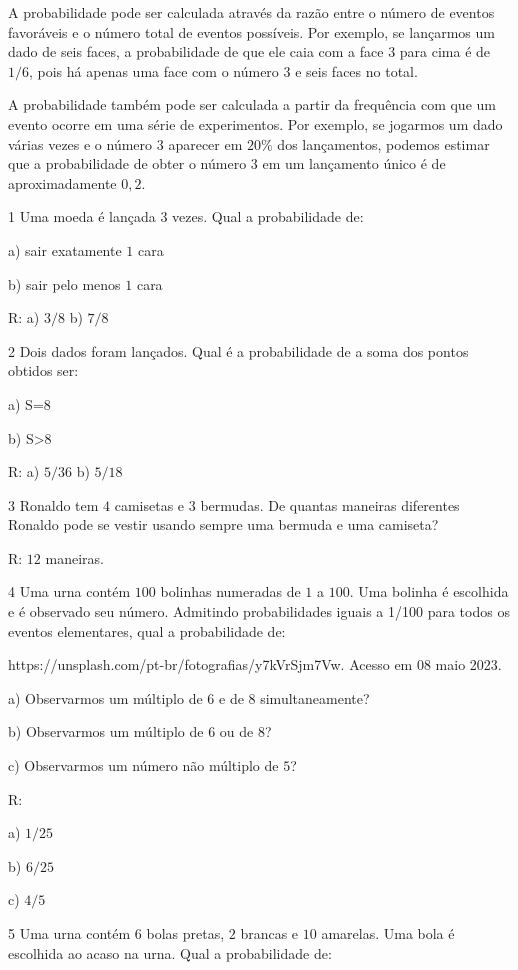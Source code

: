 A probabilidade pode ser calculada através da razão entre o número de
eventos favoráveis e o número total de eventos possíveis. Por exemplo,
se lançarmos um dado de seis faces, a probabilidade de que ele caia com
a face $3$ para cima é de $1/6$, pois há apenas uma face com o número $3$ e
seis faces no total.

A probabilidade também pode ser calculada a partir da frequência com que
um evento ocorre em uma série de experimentos. Por exemplo, se jogarmos
um dado várias vezes e o número $3$ aparecer em $20\%$ dos lançamentos,
podemos estimar que a probabilidade de obter o número $3$ em um lançamento
único é de aproximadamente $0,2$.


\num{1}  Uma moeda é lançada $3$ vezes. Qual a probabilidade de:

a) sair exatamente $1$ cara

b) sair pelo menos $1$ cara

R: a) $3/8$ b) $7/8$

\num{2}  Dois dados foram lançados. Qual é a probabilidade de a soma dos
pontos obtidos ser:

a) S=8

b) S\textgreater8

R: a) $5/36$ b) $5/18$

\num{3}  Ronaldo tem $4$ camisetas e $3$ bermudas. De quantas maneiras diferentes
Ronaldo pode se vestir usando sempre uma bermuda e uma camiseta?

R: $12$ maneiras.

\num{4}  Uma urna contém $100$ bolinhas numeradas de $1$ a $100$. Uma bolinha é
escolhida e é observado seu número. Admitindo probabilidades iguais a
1/100 para todos os eventos elementares, qual a probabilidade de:

https://unsplash.com/pt-br/fotografias/y7kVrSjm7Vw. Acesso em $08$ maio
2023.

a) Observarmos um múltiplo de $6$ e de $8$ simultaneamente?

b) Observarmos um múltiplo de $6$ ou de $8$?

c) Observarmos um número não múltiplo de $5$?

R:

a) $1/25$

b) $6/25$

c) $4/5$

\num{5}  Uma urna contém $6$ bolas pretas, $2$ brancas e $10$ amarelas. Uma bola é
escolhida ao acaso na urna. Qual a probabilidade de:

